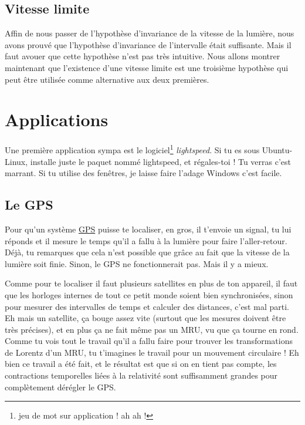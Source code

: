 \documentclass[a4paper,12pt]{book}
\theoremstyle{mes_exemples}	\newtheorem{exemple}[numtho]{Exemple}
\theoremstyle{mes_tho}
\begin{document}
					\subsection{Vitesse limite}

Affin de nous passer de l'hypothèse d'invariance de la vitesse de la lumière, nous avons prouvé que l'hypothèse d'invariance de l'intervalle était suffisante. Mais il faut avouer que cette hypothèse n'est pas très intuitive. Nous allons montrer maintenant que l'existence d'une vitesse limite est une troisième hypothèse qui peut être utilisée comme alternative aux deux premières.

\section{Applications}

Une première application sympa est le logiciel\footnote{jeu de mot sur \og application\fg{}  ! ah ah !} \emph{lightspeed}. Si tu es sous Ubuntu-Linux, installe juste le paquet nommé lightspeed, et régales-toi ! Tu verras c'est marrant. Si tu utilise des fenêtres, je laisse faire l'adage \og Windows c'est facile\fg.

\subsection{Le GPS}

Pour qu'un système \href{http://fr.wikipedia.org/wiki/Global\_Positioning\_System}{GPS} puisse te localiser, en gros, il t'envoie un signal, tu lui réponds et il mesure le temps qu'il a fallu à la lumière pour faire l'aller-retour. Déjà, tu remarques que cela n'est possible que grâce au fait que la vitesse de la lumière soit finie. Sinon, le GPS ne fonctionnerait pas. Mais il y a mieux.

Comme pour te localiser il faut plusieurs satellites en plus de ton appareil, il faut que les horloges internes de tout ce petit monde soient bien synchronisées, sinon pour mesurer des intervalles de temps et calculer des distances, c'est mal parti. Eh mais un satellite, ça bouge assez vite (surtout que les mesures doivent être très précises), et en plus ça ne fait même pas un MRU, vu que ça tourne en rond. Comme tu vois tout le travail qu'il a fallu faire pour trouver les transformations de Lorentz d'un MRU, tu t'imagines le travail pour un mouvement circulaire ! Eh bien ce travail a été fait, et le résultat est que si on en tient pas compte, les contractions temporelles liées à la relativité sont suffisamment grandes pour complètement dérégler le GPS.
\end{document}
